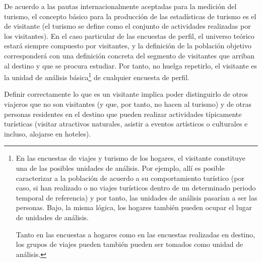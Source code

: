 \documentclass[
]{book}
\begin{document}
De acuerdo a las pautas internacionalmente aceptadas para la medición del turismo, el concepto básico para la producción de las estadísticas de turismo es el de visitante (el turismo se define como el conjunto de actividades realizadas por los visitantes). En el caso particular de las encuestas de perfil, el universo teórico estará siempre compuesto por visitantes, y la definición de la población objetivo corresponderá con una definición concreta del segmento de visitantes que arriban al destino y que se procura estudiar. Por tanto, no huelga repetirlo, el visitante es la unidad de análisis básica\footnote{En las encuestas de viajes y turismo de los hogares, el visitante constituye una de las posibles unidades de análisis. Por ejemplo, allí es posible caracterizar a la población de acuerdo a su comportamiento turístico (por caso, si han realizado o no viajes turísticos dentro de un determinado periodo temporal de referencia) y por tanto, las unidades de análisis pasarían a ser las personas. Bajo, la misma lógica, los hogares también pueden ocupar el lugar de unidades de análisis.

  Tanto en las encuestas a hogares como en las encuestas realizadas en destino, los grupos de viajes pueden también pueden ser tomados como unidad de análisis.} de cualquier encuesta de perfil.

Definir correctamente lo que es un visitante implica poder distinguirlo de otros viajeros que no son visitantes (y que, por tanto, no hacen al turismo) y de otras personas residentes en el destino que pueden realizar actividades típicamente turísticas (visitar atractivos naturales, asistir a eventos artísticos o culturales e incluso, alojarse en hoteles).
\end{document}
